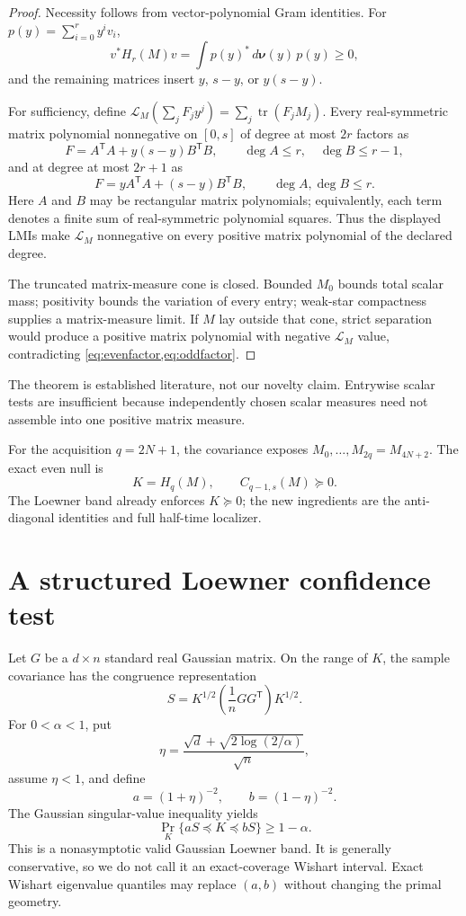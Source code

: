 \documentclass[11pt]{article}
\newcommand{\tr}{\operatorname{tr}}
\begin{document}
\begin{proof}
Necessity follows from vector-polynomial Gram identities.  For
$p(y)=\sum_{i=0}^ry^iv_i$,
\[
 v^*H_r(M)v=\int p(y)^*\,d\bm\nu(y)\,p(y)\ge0,                    \tag{3.4}
\]
and the remaining matrices insert $y$, $s-y$, or $y(s-y)$.

For sufficiency, define
$\mathcal L_M(\sum_jF_jy^j)=\sum_j\tr(F_jM_j)$.  Every real-symmetric matrix
polynomial nonnegative on $[0,s]$ of degree at most $2r$ factors as
\[
 F=A^\mathsf TA+y(s-y)B^\mathsf TB,\qquad \deg A\le r,\quad\deg B\le r-1,          \tag{3.5}\label{eq:evenfactor}
\]
and at degree at most $2r+1$ as
\[
 F=yA^\mathsf TA+(s-y)B^\mathsf TB,\qquad \deg A,\deg B\le r.                     \tag{3.6}\label{eq:oddfactor}
\]
Here $A$ and $B$ may be rectangular matrix polynomials; equivalently, each
term denotes a finite sum of real-symmetric polynomial squares.
Thus the displayed LMIs make $\mathcal L_M$ nonnegative on every positive
matrix polynomial of the declared degree.

The truncated matrix-measure cone is closed.  Bounded $M_0$ bounds total
scalar mass; positivity bounds the variation of every entry; weak-star
compactness supplies a matrix-measure limit.  If $M$ lay outside that cone,
strict separation would produce a positive matrix polynomial with negative
$\mathcal L_M$ value, contradicting \cref{eq:evenfactor,eq:oddfactor}.
\end{proof}

The theorem is established literature, not our novelty claim.  Entrywise
scalar tests are insufficient because independently chosen scalar measures
need not assemble into one positive matrix measure.

For the acquisition $q=2N+1$, the covariance exposes
$M_0,\ldots,M_{2q}=M_{4N+2}$.  The exact even null is
\[
 K=H_q(M),\qquad C_{q-1,s}(M)\succeq0.                             \tag{3.7}
\]
The Loewner band already enforces $K\succeq0$; the new ingredients are the
anti-diagonal identities and full half-time localizer.

\section{A structured Loewner confidence test}

Let $G$ be a $d\times n$ standard real Gaussian matrix.  On the range of
$K$, the sample covariance has the congruence representation
\[
 S=K^{1/2}\left(\frac1nGG^\mathsf T\right)K^{1/2}.                 \tag{4.1}
\]
For $0<\alpha<1$, put
\[
 \eta=\frac{\sqrt d+\sqrt{2\log(2/\alpha)}}{\sqrt n},              \tag{4.2}
\]
assume $\eta<1$, and define
\[
 a=(1+\eta)^{-2},\qquad b=(1-\eta)^{-2}.                           \tag{4.3}
\]
The Gaussian singular-value inequality
\cite{DavidsonSzarek2001,KoltchinskiiLounici2017} yields
\[
 \Pr_K\{aS\preceq K\preceq bS\}\ge1-\alpha.                       \tag{4.4}\label{eq:coverage}
\]
This is a nonasymptotic valid Gaussian Loewner band.  It is generally
conservative, so we do not call it an exact-coverage Wishart interval.
Exact Wishart eigenvalue quantiles may replace $(a,b)$ without changing the
primal geometry.
\end{document}
